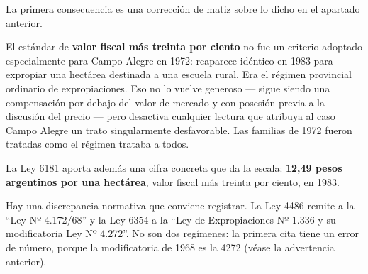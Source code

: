 \begin{cautela}
La primera consecuencia es una corrección de matiz sobre lo dicho en el apartado anterior.

El estándar de \textbf{valor fiscal más treinta por ciento} no fue un criterio adoptado especialmente para Campo Alegre en 1972: reaparece idéntico en 1983 para expropiar una hectárea destinada a una escuela rural. Era el régimen provincial ordinario de expropiaciones. Eso no lo vuelve generoso --- sigue siendo una compensación por debajo del valor de mercado y con posesión previa a la discusión del precio --- pero desactiva cualquier lectura que atribuya al caso Campo Alegre un trato singularmente desfavorable. Las familias de 1972 fueron tratadas como el régimen trataba a todos.

La Ley 6181 aporta además una cifra concreta que da la escala: \textbf{12,49 pesos argentinos por una hectárea}, valor fiscal más treinta por ciento, en 1983.

Hay una discrepancia normativa que conviene registrar. La Ley 4486 remite a la ``Ley Nº 4.172/68'' y la Ley 6354 a la ``Ley de Expropiaciones Nº 1.336 y su modificatoria Ley Nº 4.272''. No son dos regímenes: la primera cita tiene un error de número, porque la modificatoria de 1968 es la 4272 (véase la advertencia anterior).
\end{cautela}

